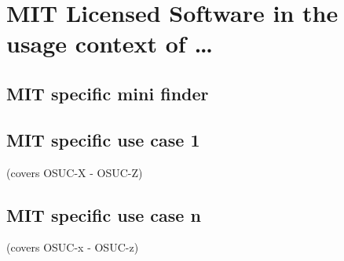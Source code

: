 %
%
%
%
%



\section{MIT Licensed Software in the usage context of \ldots}
\label{OSUC-01-MIT} \label{OSUC-03-MIT} 
\label{OSUC-06-MIT} \label{OSUC-09-MIT}

\label{OSUC-02-MIT} \label{OSUC-04-MIT} \label{OSUC-05-MIT}
\label{OSUC-07-MIT} \label{OSUC-08-MIT} \label{OSUC-10-MIT}

\subsection{MIT specific mini finder}

\subsection{MIT specific use case 1}
(covers OSUC-X - OSUC-Z)

\subsection{MIT specific use case n}
(covers OSUC-x - OSUC-z)

%
